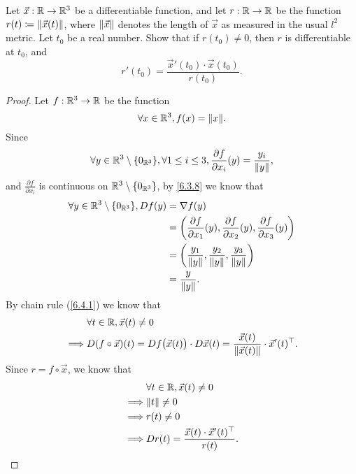 \begin{ex}\label{ex:6.4.5}
  Let \(\vec{x} : \R \to \R^3\) be a differentiable function, and let \(r : \R \to \R\) be the function \(r(t) \coloneqq \norm*{\vec{x}(t)}\), where \(\norm*{\vec{x}}\) denotes the length of \(\vec{x}\) as measured in the usual \(l^2\) metric.
  Let \(t_0\) be a real number.
  Show that if \(r(t_0) \neq 0\), then \(r\) is differentiable at \(t_0\), and
  \[
    r'(t_0) = \frac{\vec{x}'(t_0) \cdot \vec{x}(t_0)}{r(t_0)}.
  \]
\end{ex}

\begin{proof}
  Let \(f : \R^3 \to \R\) be the function
  \[
    \forall x \in \R^3, f(x) = \norm*{x}.
  \]
  Since
  \[
    \forall y \in \R^3 \setminus \{0_{\R^3}\}, \forall 1 \leq i \leq 3, \frac{\partial f}{\partial x_i}(y) = \frac{y_i}{\norm*{y}},
  \]
  and \(\frac{\partial f}{\partial x_i}\) is continuous on \(\R^3 \setminus \{0_{\R^3}\}\), by \cref{6.3.8} we know that
  \begin{align*}
    \forall y \in \R^3 \setminus \{0_{\R^3}\}, D f(y) & = \nabla f(y)                                                                                                            \\
                                                      & = \bigg(\frac{\partial f}{\partial x_1}(y), \frac{\partial f}{\partial x_2}(y), \frac{\partial f}{\partial x_3}(y)\bigg) \\
                                                      & = \bigg(\frac{y_1}{\norm*{y}}, \frac{y_2}{\norm*{y}}, \frac{y_3}{\norm*{y}}\bigg)                                        \\
                                                      & = \frac{y}{\norm*{y}}.
  \end{align*}
  By chain rule (\cref{6.4.1}) we know that
  \begin{align*}
             & \forall t \in \R, \vec{x}(t) \neq 0                                                                                                 \\
    \implies & D (f \circ \vec{x})(t) = D f\big(\vec{x}(t)\big) \cdot D \vec{x}(t) = \frac{\vec{x}(t)}{\norm*{\vec{x}(t)}} \cdot \vec{x}'(t)^\top.
  \end{align*}
  Since \(r = f \circ \vec{x}\), we know that
  \begin{align*}
             & \forall t \in \R, \vec{x}(t) \neq 0                      \\
    \implies & \norm*{t} \neq 0                                         \\
    \implies & r(t) \neq 0                                              \\
    \implies & D r(t) = \frac{\vec{x}(t) \cdot \vec{x}'(t)^\top}{r(t)}.
  \end{align*}
\end{proof}